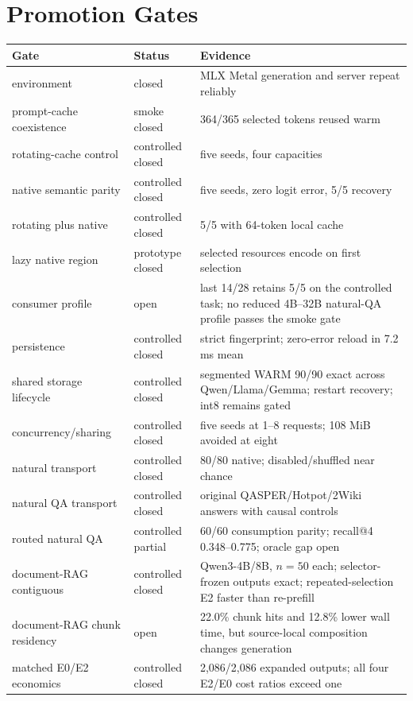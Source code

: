 \documentclass[10pt]{article}
\begin{document}
\section{Promotion Gates}
\begin{center}
\begin{tabularx}{0.96\linewidth}{l l Y}
\toprule
Gate & Status & Evidence \\
\midrule
environment & closed & MLX Metal generation and server repeat reliably \\
prompt-cache coexistence & smoke closed & 364/365 selected tokens reused warm \\
rotating-cache control & controlled closed & five seeds, four capacities \\
native semantic parity & controlled closed & five seeds, zero logit error, 5/5 recovery \\
rotating plus native & controlled closed & 5/5 with 64-token local cache \\
lazy native region & prototype closed & selected resources encode on first selection \\
consumer profile & open & last 14/28 retains 5/5 on the controlled task; no reduced 4B--32B natural-QA profile passes the smoke gate \\
persistence & controlled closed & strict fingerprint; zero-error reload in 7.2 ms mean \\
shared storage lifecycle & controlled closed & segmented WARM 90/90 exact across Qwen/Llama/Gemma; restart recovery; int8 remains gated \\
concurrency/sharing & controlled closed & five seeds at 1--8 requests; 108 MiB avoided at eight \\
natural transport & controlled closed & 80/80 native; disabled/shuffled near chance \\
natural QA transport & controlled closed & original QASPER/Hotpot/2Wiki answers with causal controls \\
routed natural QA & controlled partial & 60/60 consumption parity; recall@4 0.348--0.775; oracle gap open \\
document-RAG contiguous & controlled closed & Qwen3-4B/8B, $n=50$ each; selector-frozen outputs exact; repeated-selection E2 faster than re-prefill \\
document-RAG chunk residency & open & 22.0\% chunk hits and 12.8\% lower wall time, but source-local composition changes generation \\
matched E0/E2 economics & controlled closed & 2,086/2,086 expanded outputs; all four E2/E0 cost ratios exceed one \\

\end{tabularx}
\end{center}
\end{document}
